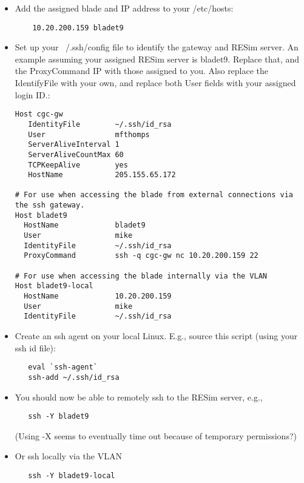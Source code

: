 \documentclass[titlepage]{article}
\begin{document}
\begin{itemize}

\item Add the assigned blade and IP address to your /etc/hosts:
\begin{verbatim}
    10.20.200.159 bladet9
\end{verbatim}

\item Set up your ~/.ssh/config file to identify the gateway and RESim server.  An example
assuming your assigned RESim server is bladet9.  Replace that, and the ProxyCommand IP with 
those assigned to you.  Also replace the IdentifyFile with your own,
and replace both User fields with your assigned login ID.:

\begin{verbatim}
Host cgc-gw
   IdentityFile        ~/.ssh/id_rsa
   User                mfthomps
   ServerAliveInterval 1
   ServerAliveCountMax 60
   TCPKeepAlive        yes
   HostName            205.155.65.172

# For use when accessing the blade from external connections via the ssh gateway.
Host bladet9
  HostName             bladet9
  User                 mike
  IdentityFile         ~/.ssh/id_rsa
  ProxyCommand         ssh -q cgc-gw nc 10.20.200.159 22

# For use when accessing the blade internally via the VLAN
Host bladet9-local
  HostName             10.20.200.159
  User                 mike
  IdentityFile         ~/.ssh/id_rsa
\end{verbatim}

\item Create an ssh agent on your local Linux.  E.g., source this script (using
your ssh id file):

\begin{verbatim}
   eval `ssh-agent`
   ssh-add ~/.ssh/id_rsa
\end{verbatim}

\item You should now be able to remotely ssh to the RESim server, e.g., 
\begin{verbatim}
   ssh -Y bladet9
\end{verbatim}
(Using -X seems to eventually time out because of temporary permissions?)

\item Or ssh locally via the VLAN
\begin{verbatim}
   ssh -Y bladet9-local
\end{verbatim}
\end{itemize}
\end{document}
